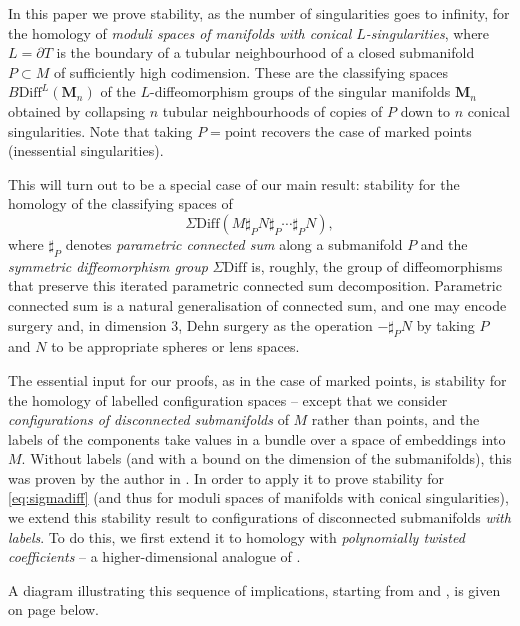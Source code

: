 \documentclass[reqno,a4paper]{article}
\numberwithin{equation}{section}
\theoremstyle{italicised}
\theoremstyle{upright}
\theoremstyle{italicised-restate}
\begin{document}
In this paper we prove stability, as the number of singularities goes to infinity, for the homology of \emph{moduli spaces of manifolds with conical $L$-singularities}, where $L = \partial T$ is the boundary of a tubular neighbourhood of a closed submanifold $P \subset M$ of sufficiently high codimension. These are the classifying spaces $B\mathrm{Diff}^L(\mathbf{M}_n)$ of the $L$-diffeomorphism groups of the singular manifolds $\mathbf{M}_n$ obtained by collapsing $n$ tubular neighbourhoods of copies of $P$ down to $n$ conical singularities. Note that taking $P = \text{point}$ recovers the case of marked points (inessential singularities).

This will turn out to be a special case of our main result: stability for the homology of the classifying spaces of
\begin{equation}
\label{eq:sigmadiff}
\Sigma\mathrm{Diff}(M \sharp_P N \sharp_P \cdots \sharp_P N),
\end{equation}
where $\sharp_P$ denotes \emph{parametric connected sum} along a submanifold $P$ and the \emph{symmetric diffeomorphism group} $\Sigma\mathrm{Diff}$ is, roughly, the group of diffeomorphisms that preserve this iterated parametric connected sum decomposition. Parametric connected sum is a natural generalisation of connected sum, and one may encode surgery and, in dimension $3$, Dehn surgery as the operation $- \sharp_P N$ by taking $P$ and $N$ to be appropriate spheres or lens spaces.

The essential input for our proofs, as in the case of marked points, is stability for the homology of labelled configuration spaces -- except that we consider \emph{configurations of disconnected submanifolds} of $M$ rather than points, and the labels of the components take values in a bundle over a space of embeddings into $M$. Without labels (and with a bound on the dimension of the submanifolds), this was proven by the author in \cite{Palmer2018HomologicalstabilitymoduliI}. In order to apply it to prove stability for \eqref{eq:sigmadiff} (and thus for moduli spaces of manifolds with conical singularities), we extend this stability result to configurations of disconnected submanifolds \emph{with labels}. To do this, we first extend it to homology with \emph{polynomially twisted coefficients} -- a higher-dimensional analogue of \cite{Palmer2018Twistedhomologicalstability}.

A diagram illustrating this sequence of implications, starting from \cite{Palmer2018HomologicalstabilitymoduliI} and \cite{Palmer2018Twistedhomologicalstability}, is given on page \pageref{diagram-implications} below.
\end{document}
